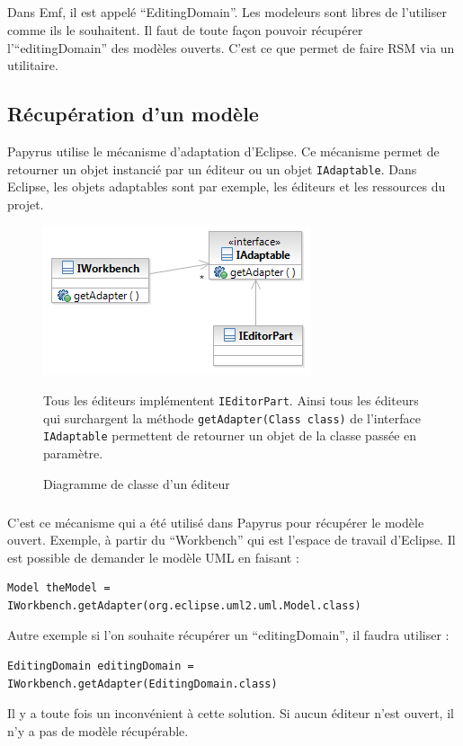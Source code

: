 \subparagraph*{}
Dans Emf, il est appelé ``EditingDomain''.
Les modeleurs sont libres de l'utiliser comme ils le souhaitent.
Il faut de toute façon pouvoir récupérer l'``editingDomain'' des modèles ouverts.
C'est ce que permet de faire RSM via un utilitaire.

\subsection{Récupération d'un modèle}

Papyrus utilise le mécanisme d'adaptation d'Eclipse.
Ce mécanisme permet de retourner un objet instancié par un éditeur ou un objet \texttt{IAdaptable}.
Dans Eclipse, les objets adaptables sont par exemple, les éditeurs et les ressources du projet.

\begin{figure}[!ht]
	\begin{minipage}[c]{0.6\linewidth}
 		\begin{center}
	  		\includegraphics[scale=.6]{images/DiagAdapter.png}
	  		\label{DiagramClassEditor}
	  		\caption{Diagramme de classe d'un éditeur}
		\end{center}
 	\end{minipage}\hfill
 	\begin{minipage}[c]{0.4\linewidth}
 		Tous les éditeurs implémentent \texttt{IEditorPart}. Ainsi tous les éditeurs qui surchargent la méthode  \texttt{getAdapter(Class class)} de l'interface \texttt{IAdaptable} permettent de retourner un objet de la classe passée en paramètre.
 	\end{minipage}
\end{figure}

\subparagraph*{}
C'est ce mécanisme qui a été utilisé dans Papyrus pour récupérer le modèle ouvert.
Exemple, à partir du ``Workbench'' qui est l'espace de travail d'Eclipse. 
Il est possible de demander le modèle UML en faisant : 
\begin{small}
\begin{verbatim}Model theModel = IWorkbench.getAdapter(org.eclipse.uml2.uml.Model.class)\end{verbatim}
\end{small}
Autre exemple si l'on souhaite récupérer un ``editingDomain'', il faudra utiliser :
\begin{small}
\begin{verbatim}EditingDomain editingDomain = IWorkbench.getAdapter(EditingDomain.class)\end{verbatim}
\end{small}
Il y a toute fois un inconvénient à cette solution. Si aucun éditeur n'est ouvert, il n'y a pas de modèle récupérable.

